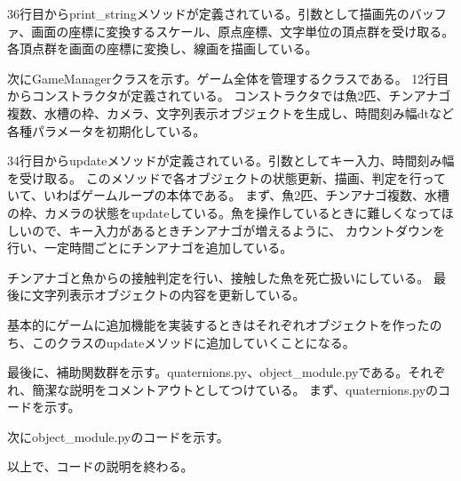 \documentclass[uplatex,dvipdfmx]{jsarticle}
\begin{document}
36行目からprint\_stringメソッドが定義されている。引数として描画先のバッファ、画面の座標に変換するスケール、原点座標、文字単位の頂点群を受け取る。
各頂点群を画面の座標に変換し、線画を描画している。



次にGameManagerクラスを示す。ゲーム全体を管理するクラスである。
12行目からコンストラクタが定義されている。
コンストラクタでは魚2匹、チンアナゴ複数、水槽の枠、カメラ、文字列表示オブジェクトを生成し、時間刻み幅dtなど各種パラメータを初期化している。

34行目からupdateメソッドが定義されている。引数としてキー入力、時間刻み幅を受け取る。
このメソッドで各オブジェクトの状態更新、描画、判定を行っていて、いわばゲームループの本体である。
まず、魚2匹、チンアナゴ複数、水槽の枠、カメラの状態をupdateしている。魚を操作しているときに難しくなってほしいので、キー入力があるときチンアナゴが増えるように、
カウントダウンを行い、一定時間ごとにチンアナゴを追加している。

チンアナゴと魚からの接触判定を行い、接触した魚を死亡扱いにしている。
最後に文字列表示オブジェクトの内容を更新している。

基本的にゲームに追加機能を実装するときはそれぞれオブジェクトを作ったのち、このクラスのupdateメソッドに追加していくことになる。



最後に、補助関数群を示す。quaternions.py、object\_module.pyである。それぞれ、簡潔な説明をコメントアウトとしてつけている。
まず、quaternions.pyのコードを示す。


次にobject\_module.pyのコードを示す。


以上で、コードの説明を終わる。
\end{document}
